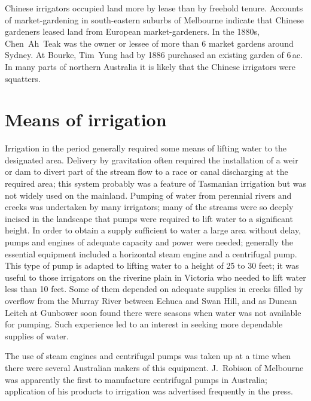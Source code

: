 Chinese irrigators occupied land more by lease than by freehold
tenure.  Accounts of market-gardening in south-eastern suburbs of
Melbourne indicate that Chinese gardeners leased land from European
market-gardeners.  In the 1880s, Chen~Ah~Teak was the owner or lessee
of more than 6 market gardens around Sydney.  At Bourke, Tim~Yung had
by 1886 purchased an existing garden of 6\,ac.  In many parts of
northern Australia it is likely that the Chinese irrigators were
squatters.

\section*{Means of irrigation}

Irrigation in the period generally required some means of lifting
water to the designated area.  Delivery by gravitation often required
the installation of a weir or dam to divert part of the stream flow to
a race or canal discharging at the required area; this system probably
was a feature of Tasmanian irrigation but was not widely used on the
mainland.  Pumping of water from perennial rivers and creeks was
undertaken by many irrigators; many of the streams were so deeply
incised in the landscape that pumps were required to lift water to a
significant height.  In order to obtain a supply sufficient to water a
large area without delay, pumps and engines of adequate capacity and
power were needed; generally the essential equipment included a
horizontal steam engine and a centrifugal pump.  This type of pump is
adapted to lifting water to a height of 25 to 30 feet; it was useful
to those irrigators on the riverine plain in Victoria who needed to
lift water less than 10 feet.  Some of them depended on adequate
supplies in creeks filled by overflow from the Murray River between
Echuca and Swan Hill, and as Duncan Leitch at Gunbower soon found
there were seasons when water was not available for pumping.  Such
experience led to an interest in seeking more dependable supplies of
water.

The use of steam engines and centrifugal pumps was taken up at a time
when there were several Australian makers of this equipment.
J.~Robison of Melbourne was apparently the first to manufacture
centrifugal pumps in Australia; application of his products to
irrigation was advertised frequently in the
press.

